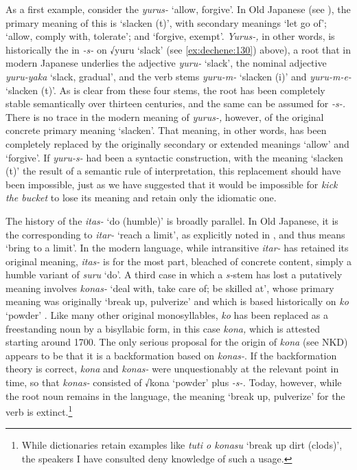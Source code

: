 \documentclass[output=paper,
modfonts
]{LSP/langsci}
\begin{document}
\newpage 
As a first example, consider the  \textit{yurus-} `allow, forgive'. In
Old Japanese (see \citealt{omodaka1967a}), the primary meaning of this 
is `slacken (t)', with secondary meanings `let go of'; `allow, comply
with, tolerate'; and `forgive, exempt'. \textit{Yurus-,} in other words,
is historically the  in \textit{-s-} on √yuru `slack' (see \ref{ex:dechene:130})
above), a root that in modern Japanese underlies the adjective 
\textit{yuru-} `slack', the nominal adjective \textit{yuru-yaka} `slack,
gradual', and the verb stems \textit{yuru-m-} `slacken (i)' and
\textit{yuru-m-e-} `slacken (t)'. As is clear from these four stems, the
root has been completely stable semantically over thirteen centuries,
and the same can be assumed for  \textit{-s-.} There is no trace
in the modern meaning of \textit{yurus-,} however, of the original
concrete primary meaning `slacken'. That meaning, in other words, has
been completely replaced by the originally secondary or extended
meanings `allow' and `forgive'. If \textit{yuru-s-} had been a syntactic
construction, with the meaning `slacken (t)' the  result of
a semantic rule of interpretation, this replacement should have been
impossible, just as we have suggested that it would be impossible for
\textit{kick the bucket} to lose its  meaning and retain only
the idiomatic one.

The history of the  \textit{itas-} `do (humble)' is broadly parallel.
In Old Japanese, it is the  corresponding to \textit{itar-}
`reach a limit', as explicitly noted in \citet{omodaka1967a}, and thus
means `bring to a limit'. In the modern language, while intransitive
\textit{itar-} has retained its original meaning, \textit{itas-} is for the
most part, bleached of concrete content, simply a  humble
variant of \textit{suru} `do'. A third case in which a \textit{s-}stem has
lost a putatively   meaning involves \textit{konas-}
`deal with, take care of; be skilled at', whose primary meaning was
originally `break up, pulverize' and which is based historically on
\textit{ko} `powder' \citep{ono1974a}. Like many other original monosyllables,
\textit{ko} has been replaced as a freestanding noun by a bisyllabic form,
in this case \textit{kona,} which is attested starting around 1700. The
only serious proposal for the origin of \textit{kona} (see NKD) appears to
be that it is a backformation based on \textit{konas-}. If the
backformation theory is correct, \textit{kona} and \textit{konas-} were
unquestionably  at the relevant point in time, so that
\textit{konas-} consisted of √kona `powder' plus  \textit{-s-.}
Today, however, while the root noun remains in the language, the meaning
`break up, pulverize' for the verb is extinct.\footnote{While
  dictionaries retain examples like \textit{tuti o konasu} `break up dirt
  (clods)', the speakers I have consulted deny knowledge of such a
  usage.}
\end{document}
